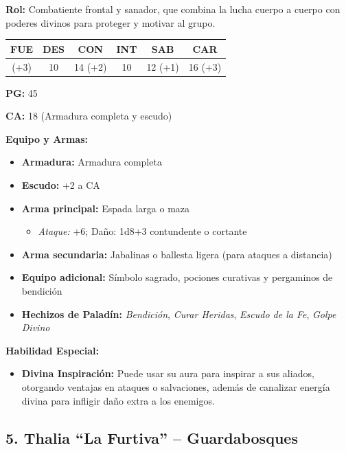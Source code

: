 \documentclass[
  twocolumn]{article}
\providecommand{\tightlist}{%
  \setlength{\itemsep}{0pt}\setlength{\parskip}{0pt}}
\begin{document}
\textbf{Rol:} Combatiente frontal y sanador, que combina la lucha cuerpo
a cuerpo con poderes divinos para proteger y motivar al grupo.

\begin{longtable}[]{@{}cccccc@{}}
\toprule\noalign{}
FUE & DES & CON & INT & SAB & CAR \\
\midrule\noalign{}
\endhead
\bottomrule\noalign{}
\endlastfoot
16 (+3) & 10 & 14 (+2) & 10 & 12 (+1) & 16 (+3) \\
\end{longtable}

\textbf{PG:} 45

\textbf{CA:} 18 (Armadura completa y escudo)

\textbf{Equipo y Armas:}

\begin{itemize}
\tightlist
\item
  \textbf{Armadura:} Armadura completa
\item
  \textbf{Escudo:} +2 a CA
\item
  \textbf{Arma principal:} Espada larga o maza

  \begin{itemize}
  \tightlist
  \item
    \emph{Ataque:} +6; Daño: 1d8+3 contundente o cortante
  \end{itemize}
\item
  \textbf{Arma secundaria:} Jabalinas o ballesta ligera (para ataques a
  distancia)
\item
  \textbf{Equipo adicional:} Símbolo sagrado, pociones curativas y
  pergaminos de bendición
\item
  \textbf{Hechizos de Paladín:} \emph{Bendición}, \emph{Curar Heridas},
  \emph{Escudo de la Fe}, \emph{Golpe Divino}
\end{itemize}

\textbf{Habilidad Especial:}

\begin{itemize}
\tightlist
\item
  \textbf{Divina Inspiración:} Puede usar su aura para inspirar a sus
  aliados, otorgando ventajas en ataques o salvaciones, además de
  canalizar energía divina para infligir daño extra a los enemigos.
\end{itemize}

\subsection{5. Thalia ``La Furtiva'' --
Guardabosques}\label{thalia-la-furtiva-guardabosques}
\end{document}
